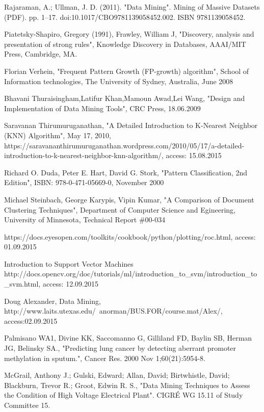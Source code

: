 \begin{thebibliography}{99}
Rajaraman, A.; Ullman, J. D. (2011). "Data Mining". Mining of Massive Datasets (PDF). pp. 1–17. doi:10.1017/CBO9781139058452.002. ISBN 9781139058452.

Piatetsky-Shapiro, Gregory (1991), Frawley, William J, "Discovery, analysis and presentation of strong rules", Knowledge Discovery in Databases, AAAI/MIT Press, Cambridge, MA.

Florian Verhein, "Frequent Pattern Growth (FP-growth) algorithm", School of Information technologies, The University of Sydney, Australia, June 2008

Bhavani Thuraisingham,Latifur Khan,Mamoun Awad,Lei Wang, "Design and Implementation of Data Mining Tools", CRC Press, 18.06.2009

Saravanan Thirumuruganathan, "A Detailed Introduction to K-Nearest Neighbor (KNN) Algorithm", May 17, 2010, https://saravananthirumuruganathan.wordpress.com/2010/05/17/a-detailed-introduction-to-k-nearest-neighbor-knn-algorithm/, access: 15.08.2015

Richard O. Duda, Peter E. Hart, David G. Stork, "Pattern Classification, 2nd Edition", ISBN: 978-0-471-05669-0, November 2000

Michael Steinbach, George Karypis, Vipin Kumar, "A Comparison of Document Clustering Techniques", Department of Computer Science and Egineering,  University of Minnesota, Technical Report \#00-034 

https://docs.eyesopen.com/toolkits/cookbook/python/plotting/roc.html, access: 01.09.2015

Introduction to Support Vector Machines http://docs.opencv.org/doc/tutorials/ml/introduction\_to\_svm/introduction\_to\_svm.html, access: 12.09.2015

Doug Alexander, Data Mining, http://www.laits.utexas.edu/~anorman/BUS.FOR/course.mat/Alex/, access:02.09.2015

Palmisano WA1, Divine KK, Saccomanno G, Gilliland FD, Baylin SB, Herman JG, Belinsky SA., "Predicting lung cancer by detecting aberrant promoter methylation in sputum.", Cancer Res. 2000 Nov 1;60(21):5954-8.

McGrail, Anthony J.; Gulski, Edward; Allan, David; Birtwhistle, David; Blackburn, Trevor R.; Groot, Edwin R. S., "Data Mining Techniques to Assess the Condition of High Voltage Electrical Plant". CIGRÉ WG 15.11 of Study Committee 15.

\end{thebibliography}